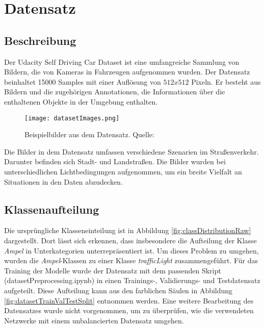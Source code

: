 \chapter{Datensatz}\label{chap:dataset}
\section{Beschreibung}
Der Udacity Self Driving Car Dataset \cite{datasetSelfDrivingCar} ist eine umfangreiche Sammlung von Bildern, die von Kameras in Fahrzeugen aufgenommen wurden. Der Datensatz beinhaltet 15000 Samples mit einer Auflösung von $512x512$ Pixeln. Er besteht aus Bildern und die zugehörigen Annotationen, die Informationen über die enthaltenen Objekte in der Umgebung enthalten.

\begin{figure}
	\centering
	\texttt{[image: datasetImages.png]}
	\caption[Beispielbilder aus dem Datensatz]{Beispielbilder aus dem Datensatz. Quelle: \cite{datasetSelfDrivingCar}}
	\label{fig:datasetImages}
\end{figure}

Die Bilder in dem Datensatz umfassen verschiedene Szenarien im Straßenverkehr. Darunter befinden sich Stadt- und Landstraßen. Die Bilder wurden bei unterschiedlichen Lichtbedingungen aufgenommen, um ein breite Vielfalt an Situationen in den Daten abzudecken. 


\section{Klassenaufteilung}
Die ursprüngliche Klasseneinteilung ist in Abbildung \ref{fig:classDistributionRaw} dargestellt. Dort lässt sich erkennen, dass insbesondere die Aufteilung der Klasse \textit{Ampel} in Unterkategorien unterrepräsentiert ist. Um dieses Problem zu umgehen, wurden die \textit{Ampel}-Klassen zu einer Klasse \textit{trafficLight} zusammengeführt. Für das Training der Modelle wurde der Datensatz mit dem passenden Skript (datasetPreprocessing.ipynb) in einen Trainings-, Validierungs- und Testdatensatz aufgeteilt. Diese Aufteilung kann aus den farblichen Säulen in Abbildung \ref{fig:datasetTrainValTestSplit} entnommen werden. Eine weitere Bearbeitung des Datensatzes wurde nicht vorgenommen, um zu überprüfen, wie die verwendeten Netzwerke mit einem unbalancierten Datensatz umgehen. 

